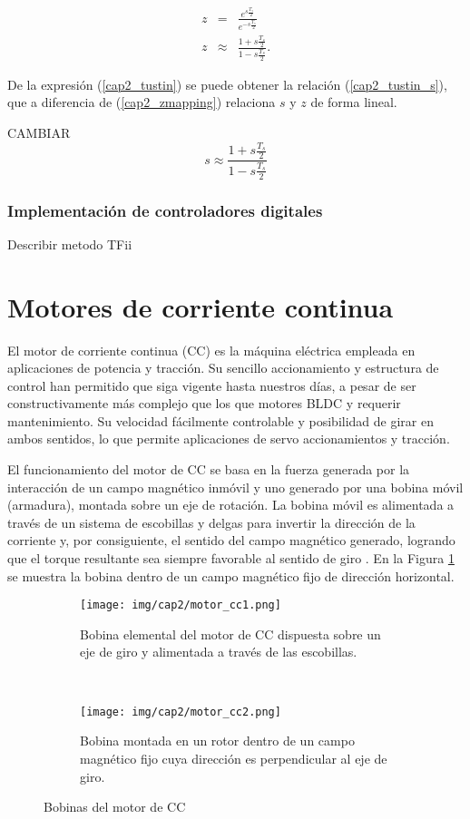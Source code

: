 \begin{eqnarray}
z &=& \frac{e^{s \frac{T_s}{2}}}{e^{-s \frac{T_s}{2}}}\\
z &\approx& \frac{1+s \frac{T_s}{2}}{1-s \frac{T_s}{2}} \label{cap2_tustin}.
\end{eqnarray}

De la expresión (\ref{cap2_tustin}) se puede obtener la relación (\ref{cap2_tustin_s}), que a diferencia de (\ref{cap2_zmapping}) relaciona $s$ y $z$ de forma lineal.

CAMBIAR
\begin{equation}\label{cap2_tustin_s}
s \approx \frac{1+s \frac{T_s}{2}}{1-s \frac{T_s}{2}}
\end{equation}

\subsubsection{Implementación de controladores digitales}

Describir metodo TFii


\section{Motores de corriente continua}

El motor de corriente continua (CC) es la máquina eléctrica empleada en aplicaciones de potencia y tracción. Su sencillo accionamiento y estructura de control han permitido que siga vigente hasta nuestros días, a pesar de ser constructivamente más complejo que los que motores BLDC y requerir mantenimiento. Su velocidad fácilmente controlable y posibilidad de girar en ambos sentidos, lo  que permite aplicaciones de servo accionamientos y tracción.

El funcionamiento del motor de CC se basa en la fuerza generada por la interacción de un campo magnético inmóvil y uno generado por una bobina móvil (armadura), montada sobre un eje de rotación. La bobina móvil es alimentada a través de un sistema de escobillas y delgas para invertir la dirección de la corriente y, por consiguiente, el sentido del campo magnético generado, logrando que el torque resultante sea siempre favorable al sentido de giro \cite{vargas2006}. En la Figura \ref{cap2_motorcc} se muestra la bobina dentro de un campo magnético fijo de dirección horizontal.

\begin{figure}[H]
    \centering
    \begin{subfigure}[b]{0.48\textwidth}
            \texttt{[image: img/cap2/motor\_cc1.png]}
            \caption{Bobina elemental del motor de CC dispuesta sobre un eje de giro y alimentada a través de las escobillas.}
    \end{subfigure}
    ~
    \begin{subfigure}[b]{0.48\textwidth}
            \texttt{[image: img/cap2/motor\_cc2.png]}
            \caption{Bobina montada en un rotor dentro de un campo magnético fijo cuya dirección es perpendicular al eje de giro.}
    \end{subfigure}
    \caption{Bobinas del motor de CC}
    \label{cap2_motorcc}
\end{figure}


